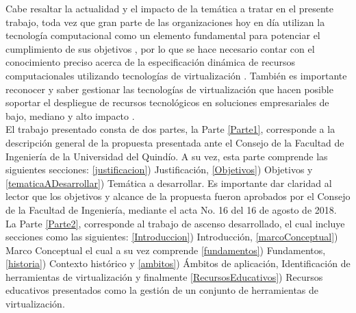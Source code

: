 Cabe resaltar la actualidad y el impacto de la temática a tratar en el presente trabajo, toda vez que gran parte de las organizaciones hoy en día utilizan la tecnología computacional como un elemento fundamental para potenciar el cumplimiento de sus objetivos \parencite{Pessolani2012}, por lo que se hace necesario contar con el conocimiento preciso acerca de la especificación dinámica de recursos computacionales utilizando tecnologías de virtualización \parencite{Hui2014}. También es importante reconocer y saber gestionar las tecnologías de virtualización que hacen posible soportar el despliegue de recursos tecnológicos en soluciones empresariales de bajo, mediano y alto impacto \parencite{Chiueh2005}. \\

El trabajo presentado consta de dos partes, la Parte \ref{Parte1}, corresponde a la descripción general de la propuesta presentada ante el Consejo de la Facultad de Ingeniería de la Universidad del Quindío. A su vez, esta parte comprende las siguientes secciones: \ref{justificacion}) Justificación, \ref{Objetivos}) Objetivos y \ref{tematicaADesarrollar}) Temática a desarrollar. Es importante dar claridad al lector que los objetivos y alcance de la propuesta fueron aprobados por el Consejo de la Facultad de Ingeniería, mediante el acta No. 16 del 16 de agosto de 2018. La Parte \ref{Parte2}, corresponde al trabajo de ascenso desarrollado, el cual incluye secciones como las siguientes: \ref{Introduccion}) Introducción, \ref{marcoConceptual}) Marco Conceptual el cual a su vez comprende \ref{fundamentos}) Fundamentos, \ref{historia}) Contexto histórico y \ref{ambitos}) Ámbitos de aplicación, Identificación de herramientas de virtualización y finalmente  \ref{RecursosEducativos}) Recursos educativos presentados como la gestión de un conjunto de herramientas de virtualización.\\